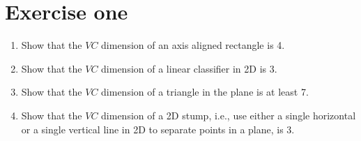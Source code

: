 \section{Exercise one}

\begin{enumerate}
    \item Show that the $VC$ dimension of an axis aligned rectangle is 4.
    \item Show that the $VC$ dimension of a linear classifier in 2D is 3.
    \item Show that the $VC$ dimension of a triangle in the plane is at least 7.
    \item Show that the $VC$ dimension of a 2D stump, i.e., use either a single horizontal or a single vertical line in 2D to separate points in a plane, is 3.
\end{enumerate}

